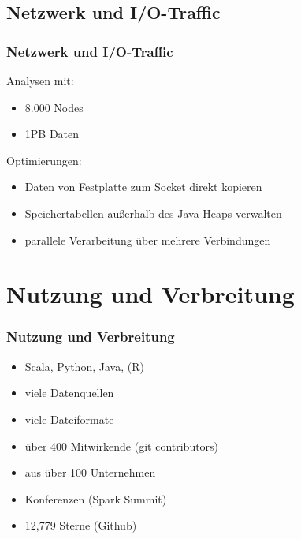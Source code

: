\documentclass[hyperref={pdfpagelabels=false}]{beamer}
\begin{document}
 \subsection{Netzwerk und I/O-Traffic}
\begin{frame} [t]
\frametitle{Netzwerk und I/O-Traffic}
Analysen mit:
\begin{itemize}
	\item 8.000 Nodes
	\item 1PB Daten	
\end{itemize}

\vspace{0.4cm}
 {
Optimierungen:
\begin{itemize}
	\item Daten von Festplatte zum Socket direkt kopieren
	\item Speichertabellen außerhalb des Java Heaps verwalten
	\item parallele Verarbeitung über mehrere Verbindungen	
\end{itemize}
}
\end{frame}


\section{Nutzung und Verbreitung}
\begin{frame} [t]
\frametitle{Nutzung und Verbreitung}

\begin{itemize}
	\item Scala, Python, Java, (R)
	\item viele Datenquellen
	\item viele Dateiformate	
	\item über 400 Mitwirkende (git contributors)
	\item aus über 100 Unternehmen
	\item Konferenzen (Spark Summit)
	\item 12,779 Sterne (Github)
\end{itemize}

 {
	\begin{figure}[h]
	
	\end{figure}
}

\end{frame}
\end{document}
